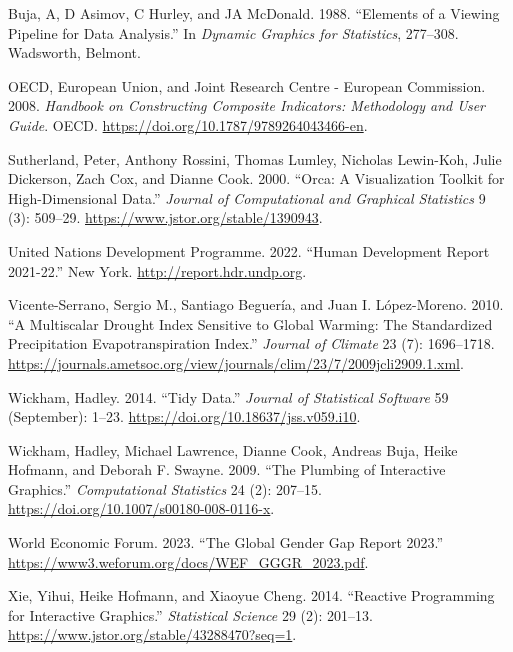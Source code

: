 \documentclass[
]{interact}
\newlength{\cslhangindent}
\newlength{\cslentryspacingunit} %
\newenvironment{CSLReferences}[2] %
 {%
  \setlength{\parindent}{0pt}
  \ifodd #1
  \let\oldpar\par
  \def\par{\hangindent=\cslhangindent\oldpar}
  \fi
  \setlength{\parskip}{#2\cslentryspacingunit}
 }%
 {}
\begin{document}
\hypertarget{refs}{}
\begin{CSLReferences}{1}{0}
\leavevmode{}%
Buja, A, D Asimov, C Hurley, and JA McDonald. 1988. {``Elements of a
Viewing Pipeline for Data Analysis.''} In \emph{Dynamic Graphics for
Statistics}, 277--308. Wadsworth, Belmont.

\leavevmode{}%
OECD, European Union, and Joint Research Centre - European Commission.
2008. \emph{Handbook on {Constructing} {Composite} {Indicators}:
{Methodology} and {User} {Guide}}. OECD.
\url{https://doi.org/10.1787/9789264043466-en}.

\leavevmode{}%
Sutherland, Peter, Anthony Rossini, Thomas Lumley, Nicholas Lewin-Koh,
Julie Dickerson, Zach Cox, and Dianne Cook. 2000. {``Orca: {A}
{Visualization} {Toolkit} for {High}-{Dimensional} {Data}.''}
\emph{Journal of Computational and Graphical Statistics} 9 (3): 509--29.
\url{https://www.jstor.org/stable/1390943}.

\leavevmode{}%
United Nations Development Programme. 2022. {``Human Development Report
2021-22.''} New York. \url{http://report.hdr.undp.org}.

\leavevmode{}%
Vicente-Serrano, Sergio M., Santiago Beguería, and Juan I. López-Moreno.
2010. {``A {Multiscalar} {Drought} {Index} {Sensitive} to {Global}
{Warming}: {The} {Standardized} {Precipitation} {Evapotranspiration}
{Index}.''} \emph{Journal of Climate} 23 (7): 1696--1718.
\url{https://journals.ametsoc.org/view/journals/clim/23/7/2009jcli2909.1.xml}.

\leavevmode{}%
Wickham, Hadley. 2014. {``Tidy {Data}.''} \emph{Journal of Statistical
Software} 59 (September): 1--23.
\url{https://doi.org/10.18637/jss.v059.i10}.

\leavevmode{}%
Wickham, Hadley, Michael Lawrence, Dianne Cook, Andreas Buja, Heike
Hofmann, and Deborah F. Swayne. 2009. {``The Plumbing of Interactive
Graphics.''} \emph{Computational Statistics} 24 (2): 207--15.
\url{https://doi.org/10.1007/s00180-008-0116-x}.

\leavevmode{}%
World Economic Forum. 2023. {``{The Global Gender Gap Report 2023}.''}
\url{https://www3.weforum.org/docs/WEF_GGGR_2023.pdf}.

\leavevmode{}%
Xie, Yihui, Heike Hofmann, and Xiaoyue Cheng. 2014. {``Reactive
{Programming} for {Interactive} {Graphics}.''} \emph{Statistical
Science} 29 (2): 201--13.
\url{https://www.jstor.org/stable/43288470?seq=1}.

\end{CSLReferences}
\end{document}
